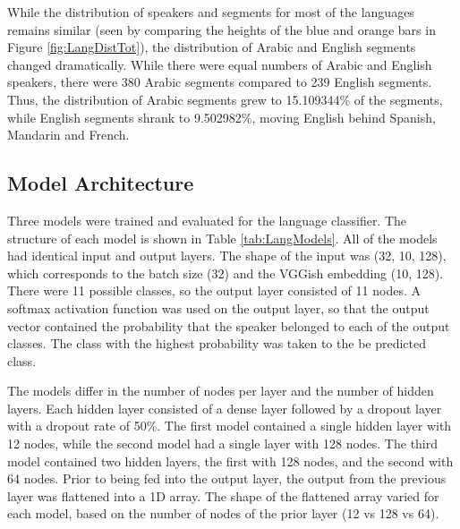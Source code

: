 While the distribution of speakers and segments for most of the languages remains similar (seen by comparing the heights of the blue and orange bars in Figure \ref{fig:LangDistTot}), the distribution of Arabic and English segments changed dramatically. While there were equal numbers of Arabic and English speakers, there were 380 Arabic segments compared to 239 English segments. Thus, the distribution of Arabic segments grew to 15.109344\% of the segments, while English segments shrank to 9.502982\%, moving English behind Spanish, Mandarin and French.

\subsection{Model Architecture}

Three models were trained and evaluated for the language classifier. The structure of each model is shown in Table \ref{tab:LangModels}. All of the models had identical input and output layers. The shape of the input was (32, 10, 128), which corresponds to the batch size (32) and the VGGish embedding (10, 128).  There were 11 possible classes, so the output layer consisted of 11 nodes. A softmax activation function was used on the output layer, so that the output vector contained the probability that the speaker belonged to each of the output classes. The class with the highest probability was taken to the be predicted class.

The models differ in the number of nodes per layer and the number of hidden layers. Each hidden layer consisted of a dense layer followed by a dropout layer with a dropout rate of 50\%. The first model contained a single hidden layer with 12 nodes, while the second model had a single layer with 128 nodes. The third model contained two hidden layers, the first with 128 nodes, and the second with 64 nodes. Prior to being fed into the output layer, the output from the previous layer was flattened into a 1D array. The shape of the flattened array varied for each model, based on the number of nodes of the prior layer (12 vs 128 vs 64).

